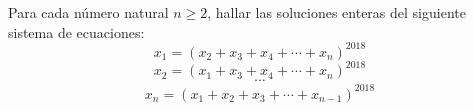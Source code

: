Para cada número natural $n \geq 2$, hallar las soluciones enteras del siguiente sistema de ecuaciones:
\[ x_1 = (x_2 + x_3 + x_4 + \cdots + x_n)^{2018} \]
\[ x_2 = (x_1 + x_3 + x_4 + \cdots + x_n)^{2018} \]
\[\cdots\]
\[ x_n = (x_1 + x_2 + x_3 + \cdots + x_{n-1})^{2018} \]
